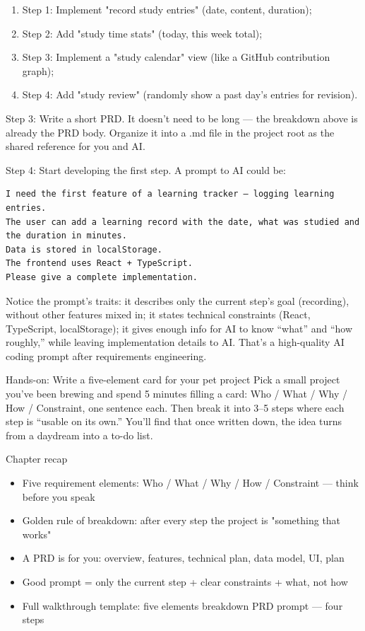 \begin{enumerate}
  \item Step 1: Implement "record study entries" (date, content, duration);
  \item Step 2: Add "study time stats" (today, this week total);
  \item Step 3: Implement a "study calendar" view (like a GitHub contribution graph);
  \item Step 4: Add "study review" (randomly show a past day's entries for revision).
\end{enumerate}

Step 3: Write a short PRD. It doesn't need to be long — the breakdown above is already the PRD body. Organize it into a .md file in the project root as the shared reference for you and AI.

Step 4: Start developing the first step. A prompt to AI could be:

\begin{lstlisting}
I need the first feature of a learning tracker — logging learning entries.
The user can add a learning record with the date, what was studied and the duration in minutes.
Data is stored in localStorage.
The frontend uses React + TypeScript.
Please give a complete implementation.
\end{lstlisting}

Notice the prompt's traits: it describes only the current step's goal (recording), without other features mixed in; it states technical constraints (React, TypeScript, localStorage); it gives enough info for AI to know “what” and “how roughly,” while leaving implementation details to AI. That's a high-quality AI coding prompt after requirements engineering.

\begin{tcbpractice}{Hands-on: Write a five-element card for your pet project}
Pick a small project you've been brewing and spend 5 minutes filling a card: Who / What / Why / How / Constraint, one sentence each. Then break it into 3–5 steps where each step is “usable on its own.” You'll find that once written down, the idea turns from a daydream into a to-do list.

\end{tcbpractice}

\begin{tcbsummary}{Chapter recap}
\begin{itemize}
  \item Five requirement elements: Who / What / Why / How / Constraint — think before you speak
  \item Golden rule of breakdown: after every step the project is "something that works"
  \item A PRD is for you: overview, features, technical plan, data model, UI, plan
  \item Good prompt = only the current step + clear constraints + what, not how
  \item Full walkthrough template: five elements breakdown PRD prompt — four steps
\end{itemize}

\end{tcbsummary}
